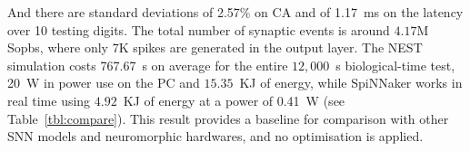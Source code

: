 And there are standard deviations of 2.57\% on CA and of 1.17~ms on the latency over 10 testing digits.
The total number of synaptic events is around $4.17$M Sopbs, where only 7K spikes are generated in the output layer. 
The NEST simulation costs 767.67~s on average for the entire $12,000$~s biological-time test, 20~W in power use on the PC and $15.35$~KJ of energy, while SpiNNaker works in real time using $4.92$~KJ of energy at a power of 0.41~W (see Table~\ref{tbl:compare}).
This result provides a baseline for comparison with other SNN models and neuromorphic hardwares, and no optimisation is applied.
